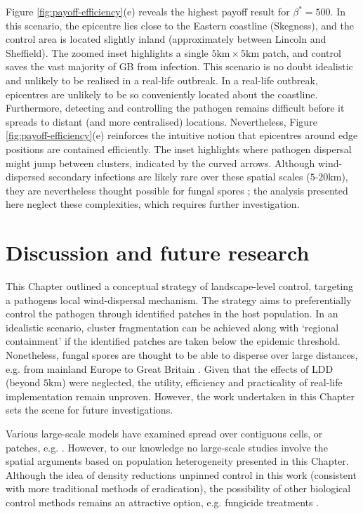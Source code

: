 Figure \ref{fig:payoff-efficiency}(e) reveals the highest payoff result for $\beta^*=500$.
In this scenario, the epicentre lies close to the Eastern coastline (Skegness), 
and the control area is located slightly inland (approximately between Lincoln and Sheffield).
The zoomed inset highlights a single $\mathrm{5km \times 5 km}$ patch, and control saves the vast majority of GB from infection.
This scenario is no doubt idealistic and unlikely to be realised in a real-life outbreak.
In a real-life outbreak, epicentres are unlikely to be so conveniently located about the coastline.
Furthermore, detecting and controlling the pathogen remains difficult before it spreads to distant (and more centralised) locations.
Nevertheless, Figure \ref{fig:payoff-efficiency}(e) reinforces the intuitive notion that epicentres around edge positions are contained efficiently.
The inset highlights where pathogen dispersal might jump between clusters, indicated by the curved arrows.
Although wind-dispersed secondary infections are likely rare over these spatial scales ($5$-$20\mathrm{km}$), they are nevertheless thought possible for fungal spores \cite{grosdidier2018tracking};
the analysis presented here neglect these complexities, which requires further investigation.


\newpage 

\section{Discussion and future research}

This Chapter outlined a conceptual strategy of landscape-level control, targeting a pathogens local wind-dispersal mechanism.
The strategy aims to preferentially control the pathogen through identified patches in the host population. 
In an idealistic scenario, cluster fragmentation can be achieved along with `regional containment' if the identified patches are taken below the epidemic threshold.
Nonetheless, fungal spores are thought to be able to disperse over large distances, e.g. from mainland Europe to Great Britain \cite{wylder2018evidence, freer2017tree}.
Given that the effects of LDD (beyond $5\mathrm{km}$) were neglected, the utility, efficiency and practicality of real-life implementation remain unproven. However, the work undertaken in this Chapter sets the scene for future investigations.

Various large-scale models have examined spread over contiguous cells, or patches, e.g. \cite{gaydos2019forecasting, large-scale-control, meentemeyer2011epidemiological}.
However, to our knowledge no large-scale studies involve the spatial arguments based on population heterogeneity presented in this Chapter.
Although the idea of density reductions unpinned control in this work (consistent with more traditional methods of eradication),
the possibility of other biological control methods remains an attractive option, e.g. fungicide treatments \cite{hauptman2015application}.

